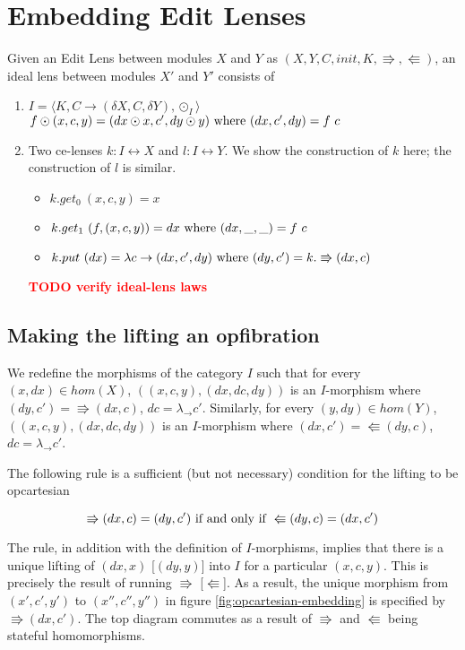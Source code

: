 \documentclass[a4paper,10pt]{article}
\newcommand{\finish}[1]{#1}
\newcommand{\comment}[1]{\finish{\textbf{\textcolor{red}{#1}}}}
\begin{document}
\section{Embedding Edit Lenses}
Given an Edit Lens between modules $X$ and $Y$ as $(X,Y,C,init,K,\Rrightarrow,\Lleftarrow)$, an ideal lens between modules $X'$ and $Y'$ consists of
\begin{enumerate}

\item $I = \langle K, C \to (\delta X, C, \delta Y), \odot_I \rangle$ \\
      $f \odot (x, c, y) = (dx \odot x, c', dy \odot y) \textnormal{ where } (dx, c', dy) = f~c $ \\
\item Two ce-lenses $k: I \leftrightarrow X$ and $l : I \leftrightarrow Y$. We show the construction of $k$ here; the construction of $l$ is similar.
  \begin{itemize}
   \item $k.get_0~(x,c,y) = x$
   \item $k.get_1~(f, (x,c,y)) = dx \textnormal{ where } (dx, \_, \_) = f~c$
   \item $k.put~(dx) = \lambda c \to (dx, c', dy) \textnormal{ where } (dy, c') = k.\Rrightarrow(dx, c)$
  \end{itemize}
  
\comment{TODO verify ideal-lens laws}

\end{enumerate}

\subsection{Making the lifting an opfibration}
  We redefine the morphisms of the category $I$ such that for every $(x, dx) \in hom(X)$, $((x,c,y),(dx,dc,dy))$ is an $I$-morphism where $(dy,c') = \Rrightarrow (dx,c)$, $dc = \lambda _ \to c'$.
  Similarly, for every $(y, dy) \in hom(Y)$, $((x,c,y),(dx,dc,dy))$ is an $I$-morphism where $(dx,c') = \Lleftarrow (dy,c)$, $dc = \lambda _ \to c'$. 
  
  The following rule is a sufficient (but not necessary) condition for the lifting to be opcartesian
  
  \[ \Rrightarrow (dx,c) = (dy, c') \textnormal{ if and only if } \Lleftarrow (dy, c) = (dx, c') \]

  The rule, in addition with the definition of $I$-morphisms, implies that there is a unique lifting of $(dx, x)$ [$(dy, y)$] into $I$ for a particular $(x,c,y)$. This is precisely the result of running $\Rrightarrow$ [$\Lleftarrow$]. As a result, the unique morphism from $(x',c',y')$ to $(x'',c'',y'')$ in figure \ref{fig:opcartesian-embedding} is specified by $\Rrightarrow (dx, c')$. The top diagram commutes as a result of $\Rrightarrow$ and $\Lleftarrow$ being stateful homomorphisms.
  
\end{document}

